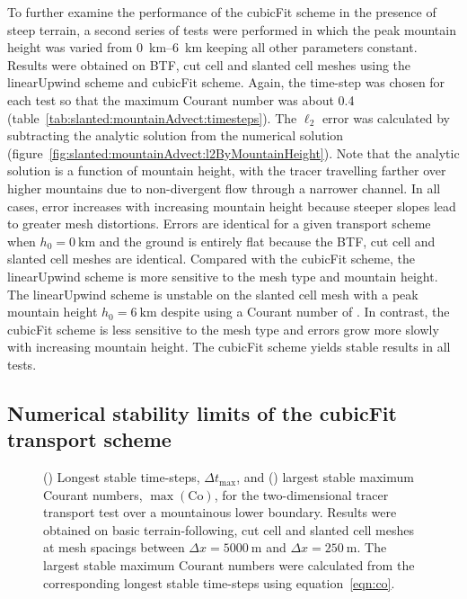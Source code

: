 To further examine the performance of the cubicFit scheme in the presence of steep terrain, a second series of tests were performed in which the peak mountain height was varied from \SIrange{0}{6}{\kilo\meter} keeping all other parameters constant.
Results were obtained on BTF, cut cell and slanted cell meshes using the linearUpwind scheme and cubicFit scheme.  Again, the time-step was chosen for each test so that the maximum Courant number was about \num{0.4} (table~\ref{tab:slanted:mountainAdvect:timesteps}).  The $\ell_2$ error was calculated by subtracting the analytic solution from the numerical solution (figure~\ref{fig:slanted:mountainAdvect:l2ByMountainHeight}).
Note that the analytic solution is a function of mountain height, with the tracer travelling farther over higher mountains due to non-divergent flow through a narrower channel.
In all cases, error increases with increasing mountain height because steeper slopes lead to greater mesh distortions.
Errors are identical for a given transport scheme when $h_0 = \SI{0}{\kilo\meter}$ and the ground is entirely flat because the BTF, cut cell and slanted cell meshes are identical.
Compared with the cubicFit scheme, the linearUpwind scheme is more sensitive to the mesh type and mountain height.  The linearUpwind scheme is unstable on the slanted cell mesh with a peak mountain height $h_0 = \SI{6}{\kilo\meter}$ despite using a Courant number of \unskip.
In contrast, the cubicFit scheme is less sensitive to the mesh type and errors grow more slowly with increasing mountain height.  The cubicFit scheme yields stable results in all tests.

\subsection{Numerical stability limits of the cubicFit transport scheme}

\begin{figure}
	\begin{subfigure}{\textwidth}
		\centering
		
		\label{fig:slanted:mountainAdvect:maxdt:dt}
		\label{fig:slanted:mountainAdvect:maxdt:co}
	\end{subfigure}
	\caption{() Longest stable time-steps, $\Delta t_\mathrm{max}$, and 
	() largest stable maximum Courant numbers, $\max(\mathrm{Co})$, for the two-dimensional tracer transport test over a mountainous lower boundary.  Results were obtained on basic terrain-following, cut cell and slanted cell meshes at mesh spacings between $\Delta x = \SI{5000}{\meter}$ and $\Delta x = \SI{250}{\meter}$.  The largest stable maximum Courant numbers were calculated from the corresponding longest stable time-steps using equation~\eqref{eqn:co}.}
	\label{fig:slanted:mountainAdvect:maxdt}
\end{figure}

